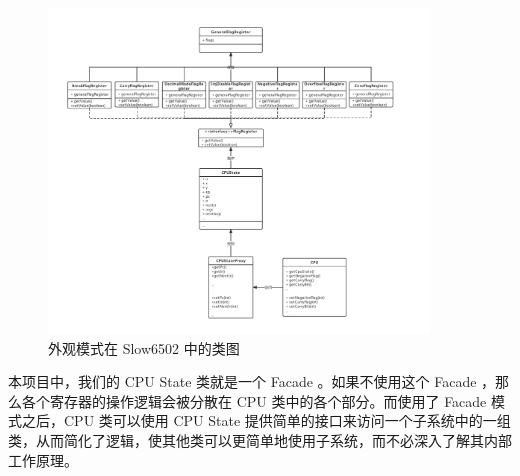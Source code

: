 \begin{figure}[h]
    \centering
    \includegraphics[width=0.9\textwidth]{figures/Facade.pdf}
    \caption{外观模式在 Slow6502 中的类图}
\end{figure}

本项目中，我们的 CPU State 类就是一个 Facade 。如果不使用这个 Facade ，那么各个寄存器的操作逻辑会被分散在 CPU 类中的各个部分。而使用了 Facade 模式之后，CPU 类可以使用 CPU State 提供简单的接口来访问一个子系统中的一组类，从而简化了逻辑，使其他类可以更简单地使用子系统，而不必深入了解其内部工作原理。